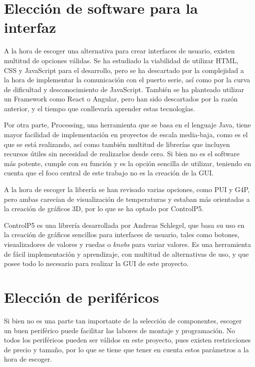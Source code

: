  \section{Elección de software para la interfaz}

 A la hora de escoger una alternativa para crear interfaces de usuario, existen multitud de opciones válidas. Se ha estudiado la viabilidad de utilizar HTML, CSS y JavaScript para el desarrollo, pero se ha descartado por la complejidad a la hora de implementar la comunicación con el puerto serie, así como por la curva de dificultad y desconocimiento de JavaScript. También se ha planteado utilizar un Framework como React o Angular, pero han sido descartados por la razón anterior, y el tiempo que conllevaría aprender estas tecnologías. 

 Por otra parte, Processing, una herramienta que se basa en el lenguaje Java, tiene mayor facilidad de implementación en proyectos de escala media-baja, como es el que se está realizando, así como también multitud de librerías que incluyen recursos útiles sin necesidad de realizarlos desde cero. Si bien no es el software más potente, cumple con su función y es la opción sencilla de utilizar, teniendo en cuenta que el foco central de este trabajo no es la creación de la GUI. 

 A la hora de escoger la librería se han revisado varias opciones, como PUI y G4P, pero ambas carecían de visualización de temperaturas y estaban más orientadas a la creación de gráficos 3D, por lo que se ha optado por ControlP5. 

 ControlP5\cite{controlP5} es una librería desarrollada por Andreas Schlegel, que basa su uso en la creación de gráficos sencillos para interfaces de usuario, tales como botones, visualizadores de valores y ruedas o \textit{knobs} para variar valores. Es una herramienta de fácil implementación y aprendizaje, con multitud de alternativas de uso, y que posee todo lo necesario para realizar la GUI de este proyecto. 
 
\section{Elección de periféricos}
 
Si bien no es una parte tan importante de la selección de componentes, escoger un buen periférico puede facilitar las labores de montaje y programación. No todos los periféricos pueden ser válidos en este proyecto, pues existen restricciones de precio y tamaño, por lo que se tiene que tener en cuenta estos parámetros a la hora de escoger. 



